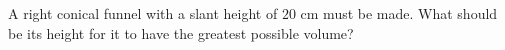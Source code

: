 
%
%
%
%
% 
% 

\question[3] A right conical funnel with a slant height of $20$ cm must be made. What should 
be its height for it to have the greatest possible volume?


\ifprintanswers
\fi 

